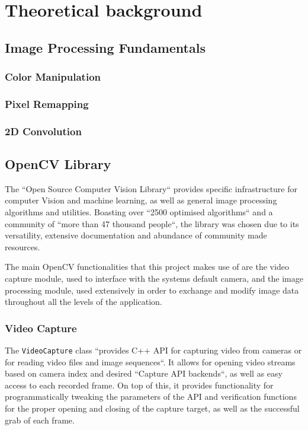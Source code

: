 \chapter{Theoretical background}

\section{Image Processing Fundamentals}

\subsection{Color Manipulation}

\subsection{Pixel Remapping}

\subsection{2D Convolution}

\section{OpenCV Library}

The ``Open Source Computer Vision Library`` provides specific infrastructure for computer Vision and
machine learning, as well as general image processing algorithms and utilities. Boasting over ``2500
optimised algorithms`` and a community of ``more than 47 thousand people``, the library was chosen
due to its versatility, extensive documentation and abundance of community made resources. \cite{opencvAbout}

The main OpenCV functionalities that this project makes use of are the video capture module, used
to interface with the systems default camera, and the image processing module, used extensively in
order to exchange and modify image data throughout all the levels of the application.

\subsection{Video Capture}

The \verb|VideoCapture| class ``provides C++ API for capturing video from cameras or for reading video 
files and image sequences``. It allows for opening video streams based on camera index and desired 
``Capture API backends``, as well as easy access to each recorded frame. On top of this, it provides
functionality for programmatically tweaking the parameters of the API and verification functions 
for the proper opening and closing of the capture target, as well as the successful grab of each frame.
\cite{opencvVideoCapture}

